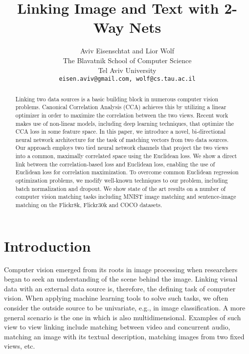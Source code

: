 \documentclass[10pt,twocolumn,letterpaper]{article}
\begin{document}
\title{Linking Image and Text with 2-Way Nets} 

\author{Aviv Eisenschtat and Lior Wolf\\
The Blavatnik School of Computer Science\\
Tel Aviv University\\
{\tt\small eisen.aviv@gmail.com, wolf@cs.tau.ac.il}}

\date{}

\maketitle

\begin{abstract}
Linking two data sources is a basic building block in numerous computer vision problems.  Canonical Correlation Analysis (CCA) achieves this by utilizing a linear optimizer in order to maximize the correlation between the two views.  Recent work makes use of non-linear models, including deep learning techniques, that optimize the CCA loss in some feature space. In this paper, we introduce a novel, bi-directional neural network architecture for the task of matching vectors from two data sources. Our approach employs two tied neural network channels that project the two views into a common, maximally correlated space using the Euclidean loss. We show a direct link between the correlation-based loss and Euclidean loss, enabling the use of Euclidean loss for correlation maximization. To overcome common Euclidean regression optimization problems, we modify well-known techniques to our problem, including batch normalization and dropout. We show state of the art results on a number of computer vision matching tasks including MNIST image matching and sentence-image matching on the Flickr8k, Flickr30k and COCO datasets.
\end{abstract}


\section{Introduction}

Computer vision emerged from its roots in image processing when researchers began to seek an understanding of the scene behind the image. Linking visual data  with an external data source  is, therefore, the defining task of computer vision. When applying machine learning tools to solve such tasks, we often consider the outside source  to be univariate, e.g., in image classification. A more general scenario is the one in which  is also multidimensional. Examples of such view to view linking include matching between video and concurrent audio, matching an image with its textual description, matching images from two fixed views, etc.
\end{document}
